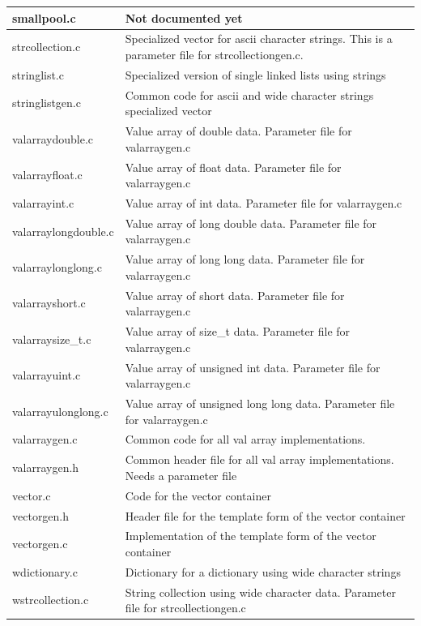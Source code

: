 \documentclass[12pt,a4paper]{memoir} %
\begin{document}
{{{\begin{longtable}{||p{3.5cm}|p{11cm}||}
smallpool.c&Not documented yet\\\hline
strcollection.c&Specialized vector for ascii character strings. This is a parameter file for strcollectiongen.c.\\\hline
stringlist.c&Specialized version of single linked lists using strings\\\hline
stringlistgen.c&Common code for ascii and wide character strings specialized vector\\\hline
valarraydouble.c&Value array of double data. Parameter file for valarraygen.c\\\hline
valarrayfloat.c&Value array of float data. Parameter file for valarraygen.c\\\hline
valarrayint.c&Value array of int data. Parameter file for valarraygen.c\\\hline
valarraylongdouble.c&Value array of long double data. Parameter file for valarraygen.c\\\hline
valarraylonglong.c&Value array of long long data. Parameter file for valarraygen.c\\\hline
valarrayshort.c&Value array of short data. Parameter file for valarraygen.c\\\hline
valarraysize\_t.c&Value array of size\_t data. Parameter file for valarraygen.c\\\hline
valarrayuint.c&Value array of unsigned int data. Parameter file for valarraygen.c\\\hline
valarrayulonglong.c&Value array of unsigned long long data. Parameter file for valarraygen.c\\\hline
valarraygen.c&Common code for all val array implementations.\\\hline
valarraygen.h&Common header file for all val array implementations. Needs a parameter file\\\hline
vector.c&Code for the vector container\\\hline
vectorgen.h&Header file for the template form of the vector container\\\hline
vectorgen.c&Implementation of the template form of the vector container\\\hline
wdictionary.c&Dictionary for a dictionary using wide character strings\\\hline
wstrcollection.c&String collection using wide character data. Parameter file for strcollectiongen.c\\\hline \hline
\end{longtable}
} %
}}
\end{document}
